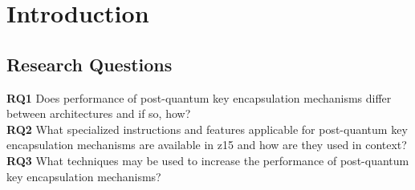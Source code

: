 \chapter{Introduction}
\label{chapter:introduction}


\section{Research Questions}
\label{section:introduction:research-questions}

\textbf{RQ1} Does performance of \gls{post-quantum} key encapsulation mechanisms differ between architectures and if so, how?\label{rq1}\\
\textbf{RQ2} What specialized instructions and features applicable for \gls{post-quantum} key encapsulation mechanisms are available in \gls{z15} and how are they used in context?\label{rq2}\\
\textbf{RQ3} What techniques may be used to increase the performance of \gls{post-quantum} key encapsulation mechanisms?\label{rq3}\\


